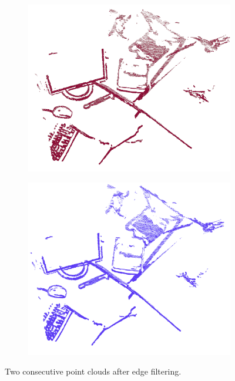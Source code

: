\begin{figure}[H]
\begin{center}
\begin{subfigure}[b]{0.45\textwidth}
\includegraphics[scale=0.3]{images/borders_consec1.png}
\caption{}
\end{subfigure}
\begin{subfigure}[b]{0.45\textwidth}
\includegraphics[scale=0.3]{images/borders_consec2.png}
\caption{}
\end{subfigure}
\caption{Two consecutive point clouds  after edge filtering.}
\end{center}
\end{figure}

